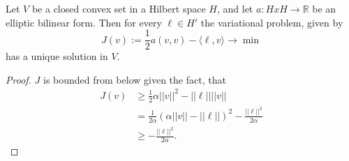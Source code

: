 \begin{thmx}
Let $V$ be a closed convex set in a Hilbert space $H$, and let $a:H x H \rightarrow \mathbb{R}$ be an elliptic bilinear form. Then for every $\ell\in H'$ the variational problem, given by
\[
    J(v):=\frac{1}{2} a(v,v) - \langle\ell,v\rangle \longrightarrow \min    
\]
has a unique solution in $V$.
\end{thmx}

\begin{proof}
    $J$ is bounded from below given the fact, that
    \begin{align*}
        J(v) &\geq \frac{1}{2} \alpha ||v||^2 - ||\ell|| ||v||\\
        &= \frac{1}{2\alpha} (\alpha ||v||-||\ell||)^2 - \frac{||\ell||^2}{2\alpha} \\
        &\geq - \frac{||\ell||^2}{2\alpha}.
    \end{align*}
    
\end{proof}